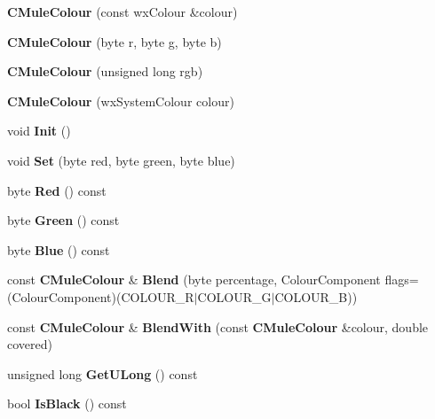 \begin{DoxyCompactItemize}
\item 
{\bfseries CMuleColour} (const wxColour \&colour)\label{classCMuleColour_a666bad4399c5d98c9690908d9b312f50}

\item 
{\bfseries CMuleColour} (byte r, byte g, byte b)\label{classCMuleColour_adfa0f07d37a889b7136ca1cd857d6b72}

\item 
{\bfseries CMuleColour} (unsigned long rgb)\label{classCMuleColour_a3024dba921fa88b77025b87da34c456c}

\item 
{\bfseries CMuleColour} (wxSystemColour colour)\label{classCMuleColour_a80a4f23f55980b3fa3aca96d8709d480}

\item 
void {\bfseries Init} ()\label{classCMuleColour_a7941d1b8610925544c7128b9f5b5802c}

\item 
void {\bfseries Set} (byte red, byte green, byte blue)\label{classCMuleColour_af4672ffeb259a74e62845896f8844e11}

\item 
byte {\bfseries Red} () const \label{classCMuleColour_a856eb1dec209ff54f0a9a05681a1e664}

\item 
byte {\bfseries Green} () const \label{classCMuleColour_a39f6b66453cba925075dee66c116b254}

\item 
byte {\bfseries Blue} () const \label{classCMuleColour_a1dd00d7320520011c3446fc497800db0}

\item 
const {\bf CMuleColour} \& {\bfseries Blend} (byte percentage, ColourComponent flags=(ColourComponent)(COLOUR\_\-R$|$COLOUR\_\-G$|$COLOUR\_\-B))\label{classCMuleColour_a75ed7758d6f8e1865238bcd2fad05867}

\item 
const {\bf CMuleColour} \& {\bfseries BlendWith} (const {\bf CMuleColour} \&colour, double covered)\label{classCMuleColour_a2875428955dbe9241bd705956d7647fa}

\item 
unsigned long {\bfseries GetULong} () const \label{classCMuleColour_a51639fc01ffad192f4f567441a7d7578}

\item 
bool {\bfseries IsBlack} () const \label{classCMuleColour_aa060c550dd7c20ac709ddfaeb933052a}


\end{DoxyCompactItemize}
